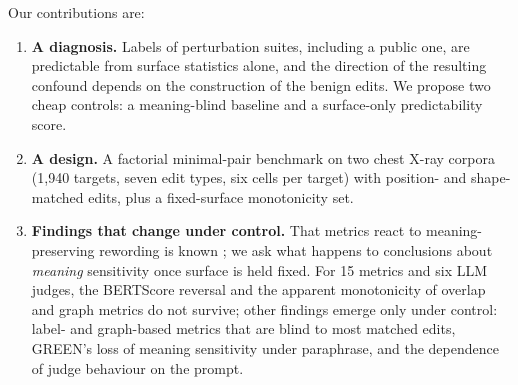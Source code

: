 \documentclass[11pt]{article}
\begin{document}
Our contributions are:
\begin{enumerate}[leftmargin=*,noitemsep]
\item \textbf{A diagnosis.} Labels of perturbation suites, including a public one, are predictable from surface statistics alone, and the direction of the resulting confound depends on the construction of the benign edits. We propose two cheap controls: a meaning-blind baseline and a surface-only predictability score.
\item \textbf{A design.} A factorial minimal-pair benchmark on two chest X-ray corpora (1,940 targets, seven edit types, six cells per target) with position- and shape-matched edits, plus a fixed-surface monotonicity set.
\item \textbf{Findings that change under control.} That metrics react to meaning-preserving rewording is known \citep{reref-2026}; we ask what happens to conclusions about \emph{meaning} sensitivity once surface is held fixed. For 15 metrics and six LLM judges, the BERTScore reversal and the apparent monotonicity of overlap and graph metrics do not survive; other findings emerge only under control: label- and graph-based metrics that are blind to most matched edits, GREEN's loss of meaning sensitivity under paraphrase, and the dependence of judge behaviour on the prompt.
\end{enumerate}
\end{document}
